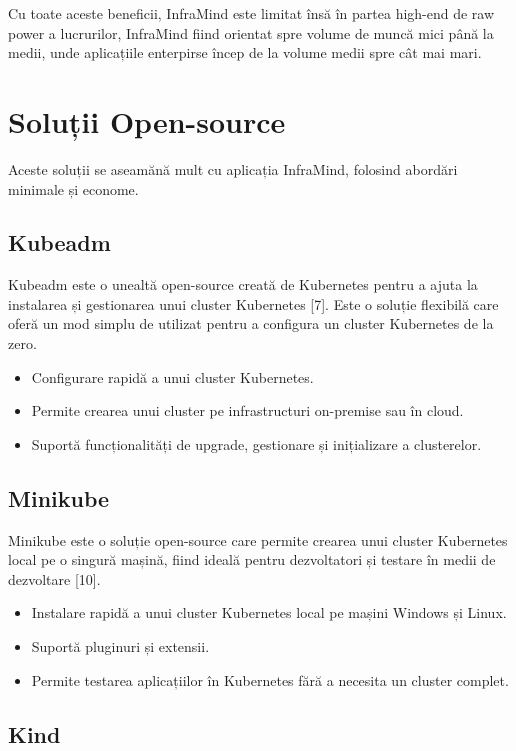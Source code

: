 \documentclass[12pt,a4paper]{report}
\begin{document}
Cu toate aceste beneficii, InfraMind este limitat însă în partea high-end de raw power a lucrurilor, InfraMind fiind orientat spre volume de muncă mici până la medii, unde aplicațiile enterpirse încep de la volume medii spre cât mai mari.

\section{Soluții Open-source}

Aceste soluții se aseamănă mult cu aplicația InfraMind, folosind abordări minimale și econome.

\subsection{Kubeadm}

Kubeadm este o unealtă open-source creată de Kubernetes pentru a ajuta la instalarea și gestionarea unui cluster Kubernetes [7]. Este o soluție flexibilă care oferă un mod simplu de utilizat pentru a configura un cluster Kubernetes de la zero.

\begin{itemize}
  \item Configurare rapidă a unui cluster Kubernetes.
  \item Permite crearea unui cluster pe infrastructuri on-premise sau în cloud.
  \item Suportă funcționalități de upgrade, gestionare și inițializare a clusterelor.
\end{itemize}

\subsection{Minikube}

Minikube este o soluție open-source care permite crearea unui cluster Kubernetes local pe o singură mașină, fiind ideală pentru dezvoltatori și testare în medii de dezvoltare [10].

\begin{itemize}
  \item Instalare rapidă a unui cluster Kubernetes local pe mașini Windows și Linux.
  \item Suportă pluginuri și extensii.
  \item Permite testarea aplicațiilor în Kubernetes fără a necesita un cluster complet.
\end{itemize}

\subsection{Kind}
\end{document}
